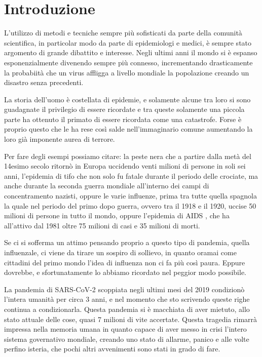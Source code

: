 \section{Introduzione}

L’utilizzo di metodi e tecniche sempre più sofisticati 
da parte della comunità scientifica, in particolar modo 
da parte di epidemiologi e medici, è sempre stato argomento 
di grande dibattito e interesse. Negli ultimi anni il mondo 
si è espanso esponenzialmente divenendo sempre più connesso,
incrementando drasticamente la probabiità che un virus 
affligga a livello mondiale la popolazione creando un 
disastro senza precedenti. 

La storia dell’uomo è costellata di epidemie, e solamente 
alcune tra loro si sono guadagnate il privilegio di essere 
ricordate e tra queste solamente una piccola parte ha ottenuto 
il primato di essere ricordata come una catastrofe. Forse 
è proprio questo che le ha rese così salde nell'immaginario 
comune aumentando la loro già imponente aurea di terrore.

Per fare degli esempi possiamo citare: la peste nera
\cite{wiki:Peste_nera} che a partire dalla 
metà del 14esimo secolo ritornò in Europa
uccidendo venti milioni di persone in soli sei anni, 
l'epidemia di tifo \cite{wiki:Tifo_esantematico} 
che non solo fu fatale durante il periodo delle crociate, 
ma anche durante la seconda guerra mondiale all'interno 
dei campi di concentramento nazisti, oppure le varie 
influenze, prima tra tutte quella spagnola \cite{wiki:Influenza_spagnola}
la quale nel periodo del primo dopo guerra, ovvero tra il 
1918 e il 1920, uccise 50 milioni di persone in tutto il mondo, 
oppure l'epidemia di AIDS \cite{wiki:Storia_della_pandemia_di_AIDS}, 
che ha all'attivo dal 1981 oltre 75 milioni di casi e 35 milioni di morti.

Se ci si sofferma un attimo pensando proprio a questo tipo 
di pandemia, quella influenzale, ci viene da tirare un 
sospiro di sollievo, in quanto oramai come cittadini del 
primo mondo l'idea di influenza non ci fa più così paura.
Eppure dovrebbe, e sfortunatamente lo abbiamo ricordato 
nel peggior modo possibile. 

La pandemia di SARS-CoV-2 \cite{wiki:Pandemia_di_COVID-19} 
scoppiata negli ultimi mesi del 2019 condizionò 
l’intera umanità per circa 3 anni, e nel momento che sto 
scrivendo queste righe continua a condizionarla. 
Questa pandemia si è macchiata di aver mietuto, 
allo stato attuale delle cose, quasi 7 milioni di vite accertate. 
Questa tragedia rimarrà impressa nella memoria umana 
in quanto capace di aver messo in crisi l'intero sistema
governativo mondiale, creando uno stato di allarme, panico e 
alle volte perfino isteria, che pochi altri avvenimenti 
sono stati in grado di fare. 


